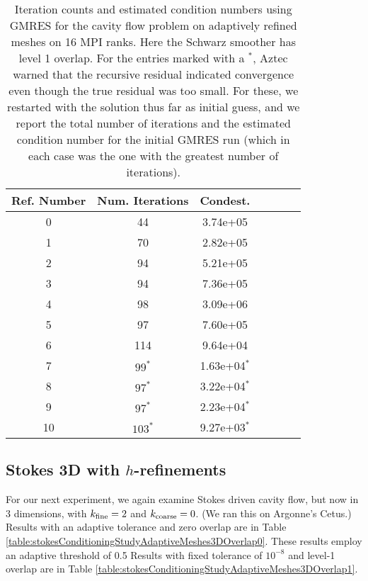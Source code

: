 \documentclass[11pt]{amsart}
\begin{document}
\begin{table}
\begin{tabular}{ c  c  c  c  c  c c}
Ref. Number	&Num. Iterations	&Condest.\\
\hline
0	&44	&3.74e+05\\
1	&70	&2.82e+05\\
2	&94	&5.21e+05\\
3	&94	&7.36e+05\\
4	&98	&3.09e+06\\
5	&97	&7.60e+05\\
6	&114	&9.64e+04\\
7	&$99^*$	&1.63e+04$^*$\\
8	&$97^*$	&3.22e+04$^*$\\
9	&$97^*$	&2.23e+04$^*$\\
10 	&$103^*$	&9.27e+03$^*$\\
\end{tabular}
\caption{Iteration counts and estimated condition numbers using GMRES for the cavity flow problem on adaptively refined meshes on 16 MPI ranks.  Here the Schwarz smoother has level 1 overlap.  For the entries marked with a $^*$, Aztec warned that the recursive residual indicated convergence even though the true residual was too small.  For these, we restarted with the solution thus far as initial guess, and we report the total number of iterations and the estimated condition number for the initial GMRES run (which in each case was the one with the greatest number of iterations).}
\label{table:stokesConditioningStudyAdaptiveMeshes16RanksGMRES}
\end{table}

\subsection{Stokes 3D with $h$-refinements}
For our next experiment, we again examine Stokes driven cavity flow, but now in 3 dimensions, with $k_{\rm fine}=2$ and $k_{\rm coarse}=0$.  (We ran this on Argonne's Cetus.)  Results with an adaptive tolerance and zero overlap are in Table \ref{table:stokesConditioningStudyAdaptiveMeshes3DOverlap0}.  These results employ an adaptive threshold of 0.5  Results with fixed tolerance of $10^{-8}$ and level-1 overlap are in Table \ref{table:stokesConditioningStudyAdaptiveMeshes3DOverlap1}.
\end{document}
